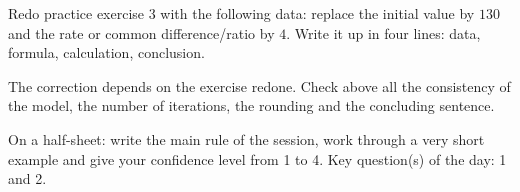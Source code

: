 
\begin{homework}Redo practice exercise 3 with the following data: replace the initial value by $130$ and the rate or common difference/ratio by $4$. Write it up in four lines: data, formula, calculation, conclusion.\end{homework}
\begin{solution}The correction depends on the exercise redone. Check above all the consistency of the model, the number of iterations, the rounding and the concluding sentence.\end{solution}

\begin{exitticket}[3 minutes]On a half-sheet: write the main rule of the session, work through a very short example and give your confidence level from 1 to 4. Key question(s) of the day: 1 and 2.\end{exitticket}

